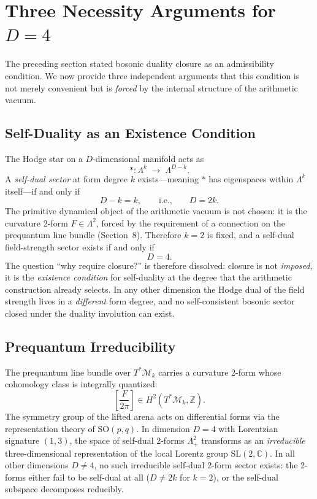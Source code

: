\documentclass[11pt]{article}
\begin{document}
\section{Three Necessity Arguments for \texorpdfstring{$D=4$}{D=4}}

The preceding section stated bosonic duality closure as an admissibility condition.
We now provide three independent arguments that this condition is not merely convenient
but is \emph{forced} by the internal structure of the arithmetic vacuum.

\subsection{Self-Duality as an Existence Condition}

The Hodge star on a $D$-dimensional manifold acts as
\begin{equation}
*\colon \Lambda^k \;\to\; \Lambda^{D-k}.
\end{equation}
A \emph{self-dual sector} at form degree $k$ exists---meaning $*$ has eigenspaces
within $\Lambda^k$ itself---if and only if
\begin{equation}
D - k = k,
\qquad\text{i.e.,}\qquad D = 2k.
\end{equation}
The primitive dynamical object of the arithmetic vacuum is not chosen: it is the
curvature 2-form $F \in \Lambda^2$, forced by the requirement of a connection on the
prequantum line bundle (Section~8).
Therefore $k=2$ is fixed, and a self-dual field-strength sector exists if and only if
\begin{equation}
D = 4.
\end{equation}
The question ``why require closure?'' is therefore dissolved: closure is not
\emph{imposed}, it is the \emph{existence condition} for self-duality at the
degree that the arithmetic construction already selects.
In any other dimension the Hodge dual of the field strength lives in a
\emph{different} form degree, and no self-consistent bosonic sector closed under
the duality involution can exist.

\subsection{Prequantum Irreducibility}

The prequantum line bundle over $T^*\mathcal{M}_k$ carries a curvature 2-form
whose cohomology class is integrally quantized:
\begin{equation}
\left[\frac{F}{2\pi}\right] \in H^2(T^*\mathcal{M}_k,\mathbb{Z}).
\end{equation}
The symmetry group of the lifted arena acts on differential forms via the
representation theory of $\mathrm{SO}(p,q)$.
In dimension $D=4$ with Lorentzian signature $(1,3)$, the space of
self-dual 2-forms $\Lambda^2_+$ transforms as an \emph{irreducible} three-dimensional
representation of the local Lorentz group $\mathrm{SL}(2,\mathbb{C})$.
In all other dimensions $D \neq 4$, no such irreducible self-dual 2-form sector
exists: the 2-forms either fail to be self-dual at all ($D\neq 2k$ for $k=2$),
or the self-dual subspace decomposes reducibly.
\end{document}
